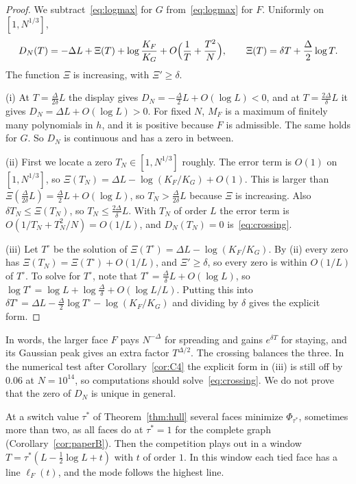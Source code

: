 \begin{proof}
We subtract~\eqref{eq:logmax} for $G$ from~\eqref{eq:logmax} for $F$. Uniformly on
$[1,N^{1/3}]$,
\[
D_N(T)=-\Delta L+\Xi(T)+\log\frac{K_F}{K_G}+O\Bigl(\frac1T+\frac{T^2}N\Bigr),
\qquad\Xi(T)=\delta T+\frac\Delta2\log T .
\]
The function $\Xi$ is increasing, with $\Xi'\ge\delta$.

(i) At $T=\frac{\Delta}{2\delta}L$ the display gives $D_N=-\frac\Delta2L+O(\log L)<0$, and at
$T=\frac{2\Delta}\delta L$ it gives $D_N=\Delta L+O(\log L)>0$. For fixed $N$, $M_F$ is a maximum
of finitely many polynomials in $h$, and it is positive because $F$ is admissible. The same holds
for $G$. So $D_N$ is continuous and has a zero in between.

(ii) First we locate a zero $T_N\in[1,N^{1/3}]$ roughly. The error term is $O(1)$ on
$[1,N^{1/3}]$, so $\Xi(T_N)=\Delta L-\log(K_F/K_G)+O(1)$. This is larger than
$\Xi(\frac\Delta{2\delta}L)=\frac\Delta2L+O(\log L)$, so $T_N>\frac\Delta{2\delta}L$ because
$\Xi$ is increasing. Also $\delta T_N\le\Xi(T_N)$, so $T_N\le\frac{2\Delta}\delta L$. With $T_N$
of order $L$ the error term is $O(1/T_N+T_N^2/N)=O(1/L)$, and $D_N(T_N)=0$
is~\eqref{eq:crossing}.

(iii) Let $T^\circ$ be the solution of $\Xi(T^\circ)=\Delta L-\log(K_F/K_G)$. By (ii) every zero
has $\Xi(T_N)=\Xi(T^\circ)+O(1/L)$, and $\Xi'\ge\delta$, so every zero is within $O(1/L)$ of
$T^\circ$. To solve for $T^\circ$, note that $T^\circ=\frac\Delta\delta L+O(\log L)$, so
$\log T^\circ=\log L+\log\frac\Delta\delta+O(\log L/L)$. Putting this into
$\delta T^\circ=\Delta L-\frac\Delta2\log T^\circ-\log(K_F/K_G)$ and dividing by $\delta$ gives
the explicit form.
\end{proof}

In words, the larger face $F$ pays $N^{-\Delta}$ for spreading and gains
$e^{\delta T}$ for staying, and its Gaussian peak gives an extra factor
$T^{\Delta/2}$. The crossing balances the three. In the numerical test after
Corollary~\ref{cor:C4} the explicit form in (iii) is still off by $0.06$ at $N=10^{14}$, so
computations should solve~\eqref{eq:crossing}. We do not prove that the zero of $D_N$ is unique in
general.

At a switch value $\tau^*$ of Theorem~\ref{thm:hull} several faces minimize
$\Phi_{\tau^*}$, sometimes more than two, as all faces do at $\tau^*=1$ for the
complete graph (Corollary~\ref{cor:paperB}). Then the competition plays out in a window $T=\tau^*(L-\frac12\log L+t)$ with $t$ of
order $1$. In this window each tied face has a line $\ell_F(t)$, and the mode
follows the highest line.

